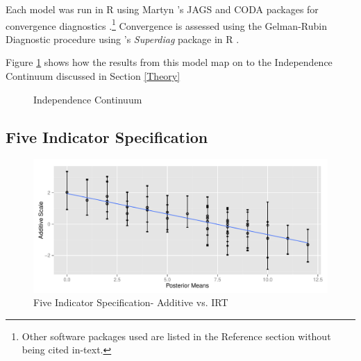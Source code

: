 \documentclass[12pt]{article}
\begin{document}
Each model was run in R using Martyn \citeauthor{r-rjags}'s JAGS and CODA packages for convergence diagnostics \citep{R,r-CODA,r-rjags}.\footnote{Other software packages used are listed in the Reference section without being cited in-text.}  Convergence is assessed using the Gelman-Rubin Diagnostic procedure using \citeauthor{r-superdiag}'s \textit{Superdiag} package in R \citep{Gelman1992,R}.

\nocite{R,r-CODA,r-Foreign,r-R2jags,r-ggplot2,r-dplyr,r-rjagsr-doParallel,r-rcurl,r-random,r-superdiag,r-polycor}

Figure \ref{continuumresults} shows how the results from this model map on to the Independence Continuum discussed in Section \ref{Theory}

\begin{figure}[tbh]\centering\caption{Independence Continuum}\label{continuumresults}
\end{figure} 

\subsection{Five Indicator Specification}
\begin{figure}
	\centering
	\caption{Five Indicator Specification- Additive vs. IRT}
	\label{fig:fiveind_additive_ggplot}
	\includegraphics[width=0.7\linewidth]{graphics/fiveind/fiveind_additive_ggplot}
\end{figure}
\end{document}
